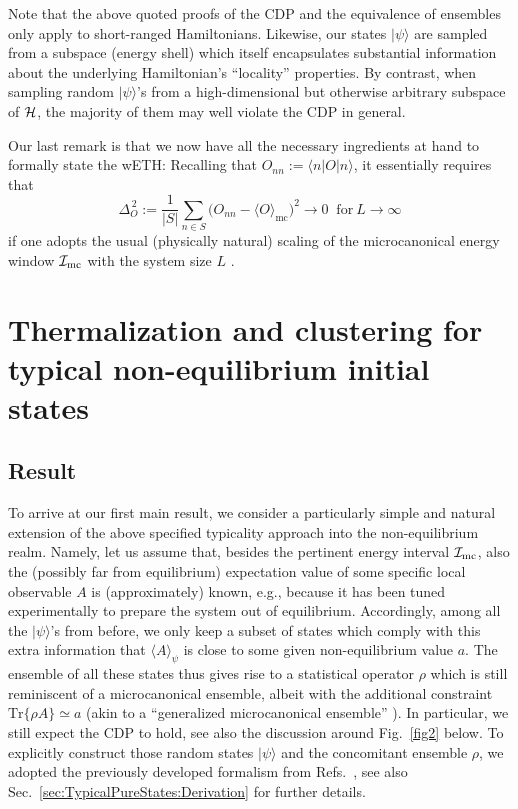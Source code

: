 \documentclass[twocolumn,aps,prb,floatfix,superscriptaddress]{revtex4-2}
\newcommand{\ket}[1]{\lvert #1 \rangle} 	%
\newcommand{\bra}[1]{\langle #1 \rvert}	%
\newcommand{\<}{\left\langle}	%
\renewcommand{\>}{\right\rangle}	%
\newcommand{\Imc}{{\cal I}_{\mathrm{mc}}}
\newcommand{\tr}{\mbox{Tr}}
\newcommand{\hr}{{\cal H}}
\newcommand{\Omc}{\langle O\rangle_{\!\mathrm{mc}}}
\begin{document}
Note that the above quoted proofs of the CDP and the equivalence of
ensembles
\cite{ara69,par82,par95,kli14,fro15,tas18}
only apply to short-ranged Hamiltonians.
Likewise, our states $\ket\psi$ are sampled from a subspace (energy shell)
which itself encapsulates substantial  information 
about the underlying Hamiltonian's ``locality'' properties.
By contrast,
when sampling random $|\psi\rangle$'s from a high-dimensional
but otherwise arbitrary subspace of $\hr$,
the majority of them may well violate the CDP in general.

Our last remark is that 
we now have all the necessary 
ingredients at
hand
to formally state
the wETH:
Recalling
that
$O_{nn} := \bra{n} O \ket{n}$,
it essentially requires that
\begin{equation}
\label{zz3}
	\Delta_O^{\,2} := 
	\frac{1}{\lvert S \rvert} \sum_{n \in S} \big( O_{nn} - \Omc \big)^{\! 2}
		\to 0
		\
		\mbox{ for}\ L \to \infty
\end{equation}
if one adopts the usual (physically natural) scaling of the microcanonical energy 
window $\Imc$ with the system size $L$ \cite{bir10,mor16,iyo17,mor18,kuw20,kuw20a}.




\section{Thermalization and clustering for typical non-equilibrium initial states}
\label{sec:TypicalPureStates}

\subsection{Result}
\label{sec:TypicalPureStates:Result}

To arrive at our first main result,
we consider a particularly simple and natural extension of 
the above specified 
typicality approach into the non-equilibrium realm. 
Namely, let us assume that, besides the pertinent energy 
interval $\Imc$, also the (possibly far from equilibrium) 
expectation value of some specific local observable $A$ is 
(approximately) known, e.g., because it has been tuned 
experimentally to prepare the system out of equilibrium.
Accordingly, among all the $\ket\psi$'s from before, 
we only keep a subset of states which comply with 
this extra information that $\langle A\rangle_{\!\psi}$ is 
close to some given non-equilibrium 
value $a$.
The ensemble of all these states thus gives 
rise to a statistical operator $\rho$ which is still 
reminiscent of a microcanonical ensemble,
albeit with the additional constraint 
$\tr\{\rho A\} \simeq a$
(akin to a ``generalized microcanonical 
ensemble'' \cite{cas11}).
In particular, we still expect the CDP to hold,
see also the discussion around Fig.~\ref{fig2} below.
To explicitly construct those random states $|\psi\rangle$
and the concomitant ensemble $\rho$, we adopted
the previously developed formalism from 
Refs.~\cite{bar09,rei20}, see also
Sec.~\ref{sec:TypicalPureStates:Derivation}
for further details.
\end{document}
